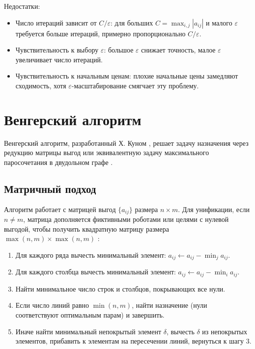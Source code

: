 Недостатки:
\begin{itemize}
    \item Число итераций зависит от \( C / \varepsilon \): для больших \( C = \max_{i,j} |a_{ij}| \) и малого \( \varepsilon \) требуется больше итераций, примерно пропорционально \( C / \varepsilon \).
    \item Чувствительность к выбору \( \varepsilon \): большое \( \varepsilon \) снижает точность, малое \( \varepsilon \) увеличивает число итераций.
    \item Чувствительность к начальным ценам: плохие начальные цены замедляют сходимость, хотя \( \varepsilon \)-масштабирование смягчает эту проблему.
\end{itemize}

\section{Венгерский алгоритм}
Венгерский алгоритм, разработанный Х. Куном \cite{kuhn1955}, решает задачу назначения через редукцию матрицы выгод или эквивалентную задачу максимального паросочетания в двудольном графе \cite{emaxx2025}.

\subsection{Матричный подход}
Алгоритм работает с матрицей выгод \( \{a_{ij}\} \) размера \( n \times m \). Для унификации, если \( n \neq m \), матрица дополняется фиктивными роботами или целями с нулевой выгодой, чтобы получить квадратную матрицу размера \( \max(n, m) \times \max(n, m) \) \cite{kuhn1955}:

\begin{enumerate}
    \item Для каждого ряда вычесть минимальный элемент: \( a_{ij} \gets a_{ij} - \min_j a_{ij} \).
    \item Для каждого столбца вычесть минимальный элемент: \( a_{ij} \gets a_{ij} - \min_i a_{ij} \).
    \item Найти минимальное число строк и столбцов, покрывающих все нули.
    \item Если число линий равно \( \min(n, m) \), найти назначение (нули соответствуют оптимальным парам) и завершить.
    \item Иначе найти минимальный непокрытый элемент \( \delta \), вычесть \( \delta \) из непокрытых элементов, прибавить к элементам на пересечении линий, вернуться к шагу 3.
\end{enumerate}

